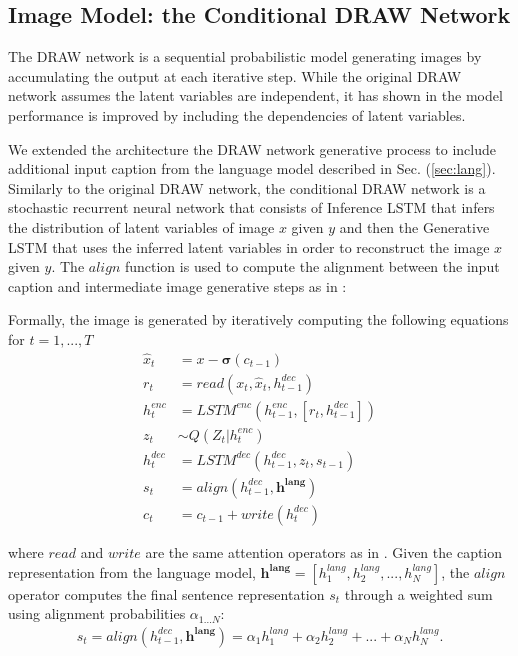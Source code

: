 \documentclass{article} %
\newcommand{\sigmoid}{\boldsymbol{\sigma}}
\newcommand{\hlang}{h^{lang}}
\newcommand{\hlangall}{\boldsymbol{h^{lang}}}
\newcommand{\hdec}{h^{dec}}
\newcommand{\henc}{h^{enc}}
\newcommand{\readop}{\mathit{read}}
\newcommand{\writeop}{\mathit{write}}
\newcommand{\encoder}{\mathit{LSTM}^{enc}}
\newcommand{\decoder}{\mathit{LSTM}^{dec}}
\newcommand{\canv}{c}
\newcommand{\lat}{z}
\newcommand{\Lat}{Z}
\newcommand{\post}{Q}
\begin{document}
\subsection{Image Model: the Conditional DRAW Network}

The DRAW network \cite{gregor_draw} is a sequential probabilistic model generating images by accumulating the output at each iterative step. While the original DRAW network assumes the latent variables are independent, it has shown in \citep{bachman_sdm} the model performance is improved by including the dependencies of latent variables. 

We extended the architecture the DRAW network generative process to include additional input caption from the language model described in Sec. (\ref{sec:lang}). Similarly to the original DRAW network, the conditional DRAW network is a stochastic recurrent neural network that consists of Inference LSTM that infers the distribution of latent variables of image $x$ given $y$ and then the Generative LSTM that uses the inferred latent variables in order to reconstruct the image $x$ given $y$. The $align$ function is used to compute the alignment between the input caption and intermediate image generative steps as in \cite{bahdanau_mt}:

Formally, the image is generated by iteratively computing the following equations for $t=1,...,T$
\begin{align}
\label{eq:x_hat}
\hat{x}_t &= x-\sigmoid(\canv_{t-1})\\
\label{eq:read}
r_t &= \readop(x_t, \hat{x}_t, \hdec_{t-1})\\
\henc_t &= \encoder(\henc_{t-1}, [r_t, \hdec_{t-1}])\\
\lat_t &\sim \post(\Lat_t|\henc_t)\\
\hdec_t &= \decoder(\hdec_{t-1}, z_t, s_{t-1})\\
s_{t} &= align(\hdec_{t-1}, \hlangall) \\
\label{eq:write}
\canv_t &= \canv_{t-1} + \writeop(\hdec_t)
\end{align}

where $\readop$ and $\writeop$ are the same attention operators as in \citep{gregor_draw}.
Given the caption representation from the language model, $\hlangall = [\hlang_{1}, \hlang_{2}, ..., \hlang_{N}]$, the $align$ operator computes the final sentence representation $s_t$ through a weighted sum using alignment probabilities $\alpha_{1...N}$:
\begin{align}
s_t=align(\hdec_{t-1}, \hlangall) = \alpha_{1}\hlang_{1} + \alpha_{2}\hlang_{2} + ... + \alpha_{N}\hlang_{N}.
\end{align}
\end{document}
